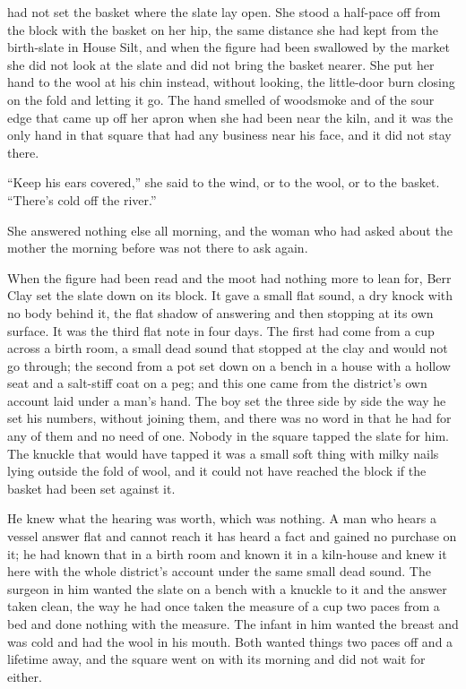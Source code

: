 had not set the basket where the slate lay open. She stood a half-pace off from the block with the basket on her hip, the same distance she had kept from the birth-slate in House Silt, and when the figure had been swallowed by the market she did not look at the slate and did not bring the basket nearer. She put her hand to the wool at his chin instead, without looking, the little-door burn closing on the fold and letting it go. The hand smelled of woodsmoke and of the sour edge that came up off her apron when she had been near the kiln, and it was the only hand in that square that had any business near his face, and it did not stay there.

“Keep his ears covered,” she said to the wind, or to the wool, or to the basket. “There's cold off the river.”

She answered nothing else all morning, and the woman who had asked about the mother the morning before was not there to ask again.

\scenebreak

When the figure had been read and the moot had nothing more to lean for, Berr Clay set the slate down on its block. It gave a small flat sound, a dry knock with no body behind it, the flat shadow of  answering and then stopping at its own surface. It was the third flat note in four days. The first had come from a cup across a birth room, a small dead sound that stopped at the clay and would not go through; the second from a pot set down on a bench in a house with a hollow seat and a salt-stiff coat on a peg; and this one came from the district's own account laid under a man's hand. The boy set the three side by side the way he set his numbers, without joining them, and there was no word in  that he had for any of them and no need of one. Nobody in the square tapped the slate for him. The knuckle that would have tapped it was a small soft thing with milky nails lying outside the fold of wool, and it could not have reached the block if the basket had been set against it.

He knew what the hearing was worth, which was nothing. A man who hears a vessel answer flat and cannot reach it has heard a fact and gained no purchase on it; he had known that in a birth room and known it in a kiln-house and knew it here with the whole district's account under the same small dead sound. The surgeon in him wanted the slate on a bench with a knuckle to it and the answer taken clean, the way he had once taken the measure of a cup two paces from a bed and done nothing with the measure. The infant in him wanted the breast and was cold and had the wool in his mouth. Both wanted things two paces off and a lifetime away, and the square went on with its morning and did not wait for either.

